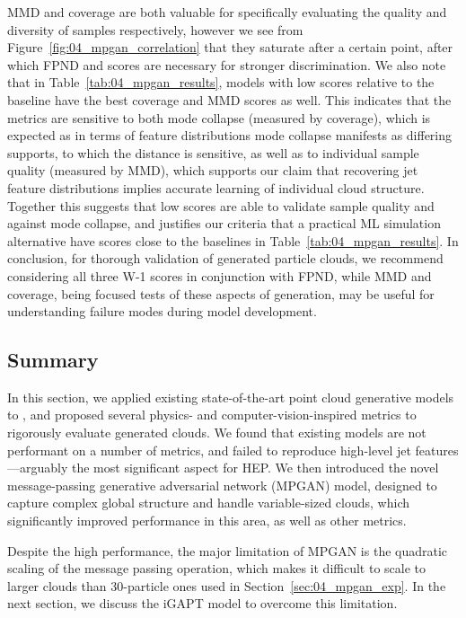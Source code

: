 MMD and coverage are both valuable for specifically evaluating the quality and diversity of samples respectively, however we see from Figure~\ref{fig:04_mpgan_correlation} that they saturate after a certain point, after which FPND and \wass scores are necessary for stronger discrimination. 
We also note that in Table~\ref{tab:04_mpgan_results}, models with low \wass scores relative to the baseline have the best coverage and MMD scores as well.
This indicates that the \wass metrics are sensitive to both mode collapse (measured by coverage), which is expected as in terms of feature distributions mode collapse manifests as differing supports, to which the \wass distance is sensitive, as well as to individual sample quality (measured by MMD), which supports our claim that recovering jet feature distributions implies accurate learning of individual cloud structure.
Together this suggests that low \wass scores are able to validate sample quality and against mode collapse, and justifies our criteria that a practical ML simulation alternative have \wass scores close to the baselines in Table~\ref{tab:04_mpgan_results}. 
In conclusion, for thorough validation of generated particle clouds, we recommend considering all three W-1 scores in conjunction with FPND, while MMD and coverage, being focused tests of these aspects of generation, may be useful for understanding failure modes during model development. 


\subsection{Summary}
\label{sec:04_mpgan_summary}

In this section, we applied existing state-of-the-art point cloud generative models to \jetnet, and proposed several physics- and computer-vision-inspired metrics to rigorously evaluate generated clouds.  
We found that existing models are not performant on a number of metrics, and failed to reproduce high-level jet features---arguably the most significant aspect for HEP.
We then introduced the novel message-passing generative adversarial network (MPGAN) model, designed to capture complex global structure and handle variable-sized clouds, which significantly improved performance in this area, as well as other metrics. 

Despite the high performance, the major limitation of MPGAN is the quadratic scaling of the message passing operation, which makes it difficult to scale to larger clouds than 30-particle ones used in Section~\ref{sec:04_mpgan_exp}.
In the next section, we discuss the iGAPT model to overcome this limitation.


